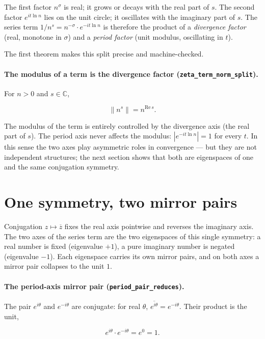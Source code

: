 \documentclass[sigplan,10pt,anonymous,review]{acmart}
\begin{document}
The first factor $n^{\sigma}$ is real; it grows or decays with the real
part of $s$. The second factor $e^{it \ln n}$ lies on the unit circle;
it oscillates with the imaginary part of $s$. The series term
$1/n^s = n^{-\sigma} \cdot e^{-it \ln n}$ is therefore the product of
a \emph{divergence factor} (real, monotone in $\sigma$) and a
\emph{period factor} (unit modulus, oscillating in $t$).

The first theorem makes this split precise and machine-checked.

\paragraph{The modulus of a term is the divergence factor
(\texttt{zeta\_term\_norm\_split}).} For $n > 0$ and $s \in
\mathbb{C}$,

\begin{equation*}
  \|n^s\| = n^{\mathrm{Re}\,s}.
\end{equation*}

The modulus of the term is entirely controlled by the divergence axis
(the real part of $s$). The period axis never affects the modulus:
$|e^{-it\ln n}| = 1$ for every $t$. In this sense the two axes play
asymmetric roles in convergence --- but they are not independent
structures; the next section shows that both are eigenspaces of one
and the same conjugation symmetry.

\section{One symmetry, two mirror pairs}

Conjugation $z \mapsto \overline{z}$ fixes the real axis pointwise and
reverses the imaginary axis. The two axes of the series term are the
two eigenspaces of this single symmetry: a real number is fixed
(eigenvalue $+1$), a pure imaginary number is negated (eigenvalue
$-1$). Each eigenspace carries its own mirror pairs, and on both axes
a mirror pair collapses to the unit $1$.

\paragraph{The period-axis mirror pair (\texttt{period\_pair\_reduces}).}
The pair $e^{i\theta}$ and $e^{-i\theta}$ are conjugate: for real
$\theta$, $\overline{e^{i\theta}} = e^{-i\theta}$. Their product is the
unit,

\begin{equation*}
  e^{i\theta} \cdot e^{-i\theta} = e^{0} = 1 .
\end{equation*}
\end{document}
